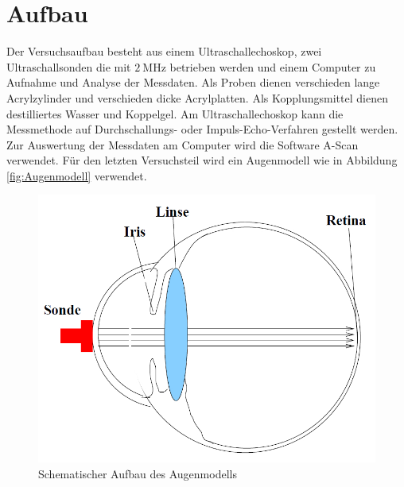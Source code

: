 \section{Aufbau}
\label{sec:Aufbau}

Der Versuchsaufbau besteht aus einem Ultraschallechoskop, zwei Ultraschallsonden die mit $\SI{2}{\mega\hertz}$ betrieben werden und einem Computer zu Aufnahme und Analyse der Messdaten. Als Proben dienen verschieden lange Acrylzylinder und verschieden dicke Acrylplatten. Als Kopplungsmittel dienen destilliertes Wasser und Koppelgel. Am Ultraschallechoskop kann die Messmethode auf Durchschallungs- oder Impuls-Echo-Verfahren gestellt werden. Zur Auswertung der Messdaten am Computer wird die Software A-Scan verwendet. Für den letzten Versuchsteil wird ein Augenmodell wie in Abbildung \ref{fig:Augenmodell} verwendet. 
\begin{figure}
\centering
\includegraphics[scale=0.3]{content/images/Augenmodell.jpg}
\caption{Schematischer Aufbau des Augenmodells \cite{US1}}
\label{fig:Aufbau}
\end{figure}